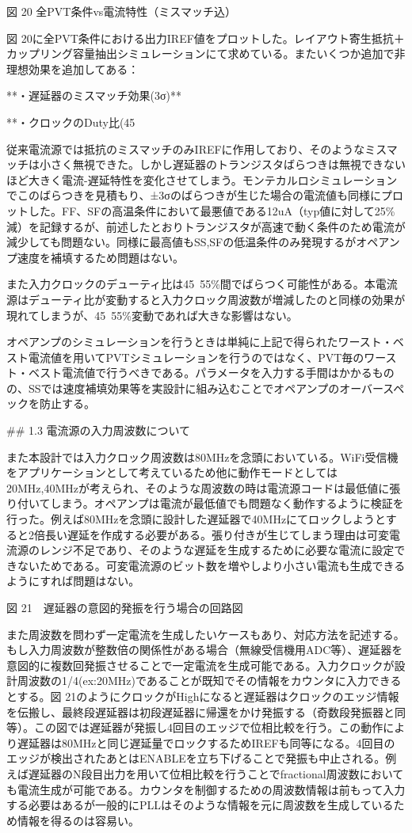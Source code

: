 \documentclass[letterpaper, 10 pt, conference]{ieeeconf}  %
\begin{document}
図 20 全PVT条件vs電流特性（ミスマッチ込）

図 20に全PVT条件における出力IREF値をプロットした。レイアウト寄生抵抗＋カップリング容量抽出シミュレーションにて求めている。またいくつか追加で非理想効果を追加してある：

**・遅延器のミスマッチ効果(3σ)**

**・クロックのDuty比(45%

従来電流源では抵抗のミスマッチのみIREFに作用しており、そのようなミスマッチは小さく無視できた。しかし遅延器のトランジスタばらつきは無視できないほど大きく電流-遅延特性を変化させてしまう。モンテカルロシミュレーションでこのばらつきを見積もり、±3σのばらつきが生じた場合の電流値も同様にプロットした。FF、SFの高温条件において最悪値である12uA（typ値に対して25\%減）を記録するが、前述したとおりトランジスタが高速で動く条件のため電流が減少しても問題ない。同様に最高値もSS,SFの低温条件のみ発現するがオペアンプ速度を補填するため問題はない。

また入力クロックのデューティ比は45~55\%間でばらつく可能性がある。本電流源はデューティ比が変動すると入力クロック周波数が増減したのと同様の効果が現れてしまうが、45~55\%変動であれば大きな影響はない。

オペアンプのシミュレーションを行うときは単純に上記で得られたワースト・ベスト電流値を用いてPVTシミュレーションを行うのではなく、PVT毎のワースト・ベスト電流値で行うべきである。パラメータを入力する手間はかかるものの、SSでは速度補填効果等を実設計に組み込むことでオペアンプのオーバースペックを防止する。

## 1.3 電流源の入力周波数について

また本設計では入力クロック周波数は80MHzを念頭においている。WiFi受信機をアプリケーションとして考えているため他に動作モードとしては20MHz,40MHzが考えられ、そのような周波数の時は電流源コードは最低値に張り付いてしまう。オペアンプは電流が最低値でも問題なく動作するように検証を行った。例えば80MHzを念頭に設計した遅延器で40MHzにてロックしようとすると2倍長い遅延を作成する必要がある。張り付きが生じてしまう理由は可変電流源のレンジ不足であり、そのような遅延を生成するために必要な電流に設定できないためである。可変電流源のビット数を増やしより小さい電流も生成できるようにすれば問題はない。

図 21　遅延器の意図的発振を行う場合の回路図

また周波数を問わず一定電流を生成したいケースもあり、対応方法を記述する。もし入力周波数が整数倍の関係性がある場合（無線受信機用ADC等）、遅延器を意図的に複数回発振させることで一定電流を生成可能である。入力クロックが設計周波数の1/4(ex:20MHz)であることが既知でその情報をカウンタに入力できるとする。図 21のようにクロックがHighになると遅延器はクロックのエッジ情報を伝搬し、最終段遅延器は初段遅延器に帰還をかけ発振する（奇数段発振器と同等）。この図では遅延器が発振し4回目のエッジで位相比較を行う。この動作により遅延器は80MHzと同じ遅延量でロックするためIREFも同等になる。4回目のエッジが検出されたあとはENABLEを立ち下げることで発振も中止される。例えば遅延器のN段目出力を用いて位相比較を行うことでfractional周波数においても電流生成が可能である。カウンタを制御するための周波数情報は前もって入力する必要はあるが一般的にPLLはそのような情報を元に周波数を生成しているため情報を得るのは容易い。
\end{document}
